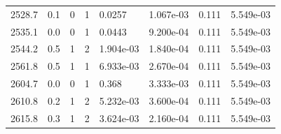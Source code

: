 \documentclass[preview]{standalone}
\begin{document}
{{{{{\begin{tabular}{L{1.2cm}C{1.2cm} C{0.3cm}C{0.5cm} C{1.4cm}C{1.4cm} C{1.4cm}C{1.4cm}}
  2528.7  &   0.1  & 0     &  1 &  0.0257  & 1.067e-03  & 0.111 &  5.549e-03   \\ 
  2535.1  &   0.0  & 0     &  1 &  0.0443  & 9.200e-04  & 0.111 &  5.549e-03   \\ 
  2544.2  &   0.5  & 1     &  2 &  1.904e-03  & 1.840e-04  & 0.111 &  5.549e-03   \\ 
  2561.8  &   0.5  & 1     &  1 &  6.933e-03  & 2.670e-04  & 0.111 &  5.549e-03   \\ 
  2604.7  &   0.0  & 0     &  1 &  0.368  & 3.333e-03  & 0.111 &  5.549e-03   \\ 
  2610.8  &   0.2  & 1     &  2 &  5.232e-03  & 3.600e-04  & 0.111 &  5.549e-03   \\ 
  2615.8  &   0.3  & 1     &  2 &  3.624e-03  & 2.160e-04  & 0.111 &  5.549e-03   \\ 
\hline 
\end{tabular} 

}}}}}
\end{document}
